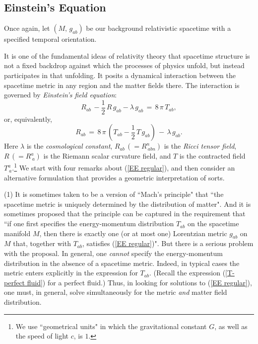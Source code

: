 \documentclass [12] {article}
\theoremstyle{plain}
\numberwithin{figure}{subsection}
\numberwithin{proposition}{subsection}
\begin{document}
\subsection{Einstein's Equation} \label{Einstein's Equation}


Once again, let $(M, \,   g_{ab})$  be our background relativistic spacetime with a specified temporal orientation. 

It is  one of the fundamental ideas of relativity theory that spacetime structure is not a fixed backdrop against which the processes of physics unfold, but instead participates in that unfolding.   It posits a dynamical interaction between the spacetime metric in any region and the matter fields there. The interaction is governed by \emph{Einstein's field equation}:
%
\begin{equation}\label{EE regular}
R_{ab} \,  - \frac{1}{2} \, R \, g_{ab}   - \lambda \, g_{ab} \,  = \,  8 \, \pi \, T_{ab},  
\end{equation} 
\noindent or, equivalently,
%
\begin{equation}\label{EE reversed}
R_{ab} \, = \,  8 \, \pi \, (T_{ab}   - \frac{1}{2} \, T \, g_{ab})  \, - \,  \lambda \, g_{ab}.  
\end{equation} 
%
Here  $\lambda$ is the  \emph{cosmological constant}, $R_{ab} \,  (= R^n_{\ abn})$ is the \emph{Ricci tensor field}, $R \, (= R^a_{\ a})$ is the Riemann scalar curvature field, and $T$ is the contracted field $T^a_{\ a}$.\footnote{We use ``geometrical units" in which the gravitational constant $G$, as well as the speed of light $c$, is $1$.  %
} We start with four remarks about (\ref{EE regular}), and then consider an alternative formulation that provides a geometric interpretation of sorts. 

(1) It is sometimes taken to be a version of ``Mach's principle" that ``the  spacetime metric is uniquely determined by the distribution of matter". And it is sometimes proposed that the principle can be captured  in the requirement that ``if one first specifies the energy-momentum distribution $T_{ab}$ on the spacetime manifold $M$, then there is exactly one (or at most one) Lorentzian metric $g_{ab}$ on $M$ that, together with $T_{ab}$, satisfies (\ref{EE regular})".  But there is a serious problem with the proposal. In general, one \emph{cannot} specify the energy-momentum  distribution in the absence of a spacetime metric.  Indeed, in typical cases the metric enters explicitly in the expression for $T_{ab}$. (Recall the expression (\ref{T-perfect fluid}) for a perfect fluid.) Thus, in looking for solutions to (\ref{EE regular}), one must, in general, solve simultaneously for the metric \emph{and} matter field distribution. 
 
\end{document}

